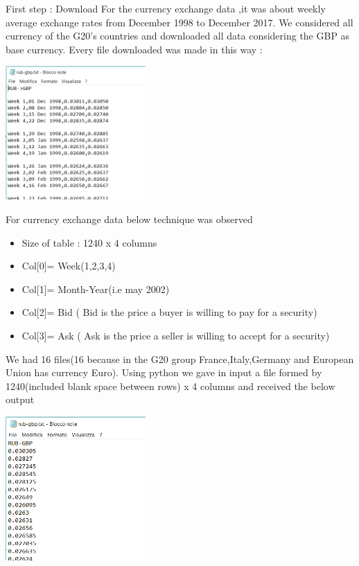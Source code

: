 \subsubsection{}{First step : Download} 
\newline
For the currency exchange data ,it was about weekly average exchange rates from December 1998 to December 2017. We considered all currency of the G20's countries and downloaded all data considering the GBP as base currency\cite{abbate2018point}. Every file downloaded was made in this way : 

\includegraphics[width=0.40\textwidth]{aaa2.png}

For currency exchange data below technique was observed
\begin{itemize} 
\item Size of table : 1240 x 4 columns 
\item Col[0]= Week(1,2,3,4) 
\item Col[1]= Month-Year(i.e may 2002) 
\item Col[2]= Bid ( Bid is the price a buyer is willing to pay for a security) 
\item Col[3]= Ask ( Ask is the price a seller is willing to accept for a security) 
\end{itemize}

We had 16 files(16 because in the G20 group France,Italy,Germany and European Union has currency Euro). Using python we gave in input a file formed by 1240(included blank space between rows) x 4 columns and received the below output 

\includegraphics[width=0.40\textwidth]{aaa1.png}

